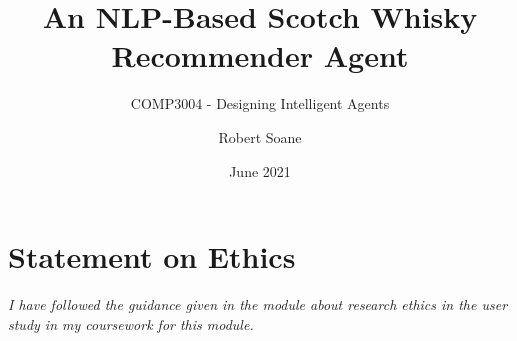 \documentclass[11pt, a4paper, oneside, notitlepage]{scrartcl}
\title{An NLP-Based Scotch Whisky Recommender Agent}
\subtitle{COMP3004 - Designing Intelligent Agents}
\author{Robert Soane}
\date{June 2021}
\begin{document}
\maketitle

\tableofcontents















\section{Statement on Ethics}\label{sec:StatementOnEthics}
\emph{I have followed the guidance given in the module about research ethics in the user study in my coursework for this module.}


\end{document}
